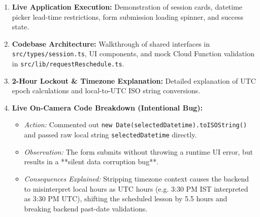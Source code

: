 \documentclass[11pt, a4paper]{article}
\begin{document}
\begin{enumerate}
  \item \textbf{Live Application Execution:} Demonstration of session cards, datetime picker lead-time restrictions, form submission loading spinner, and success state.
  \item \textbf{Codebase Architecture:} Walkthrough of shared interfaces in \texttt{src/types/session.ts}, UI components, and mock Cloud Function validation in \texttt{src/lib/requestReschedule.ts}.
  \item \textbf{2-Hour Lockout \& Timezone Explanation:} Detailed explanation of UTC epoch calculations and local-to-UTC ISO string conversions.
  \item \textbf{Live On-Camera Code Breakdown (Intentional Bug):}
  \begin{itemize}
    \item \textit{Action:} Commented out \texttt{new Date(selectedDatetime).toISOString()} and passed raw local string \texttt{selectedDatetime} directly.
    \item \textit{Observation:} The form submits without throwing a runtime UI error, but results in a **silent data corruption bug**.
    \item \textit{Consequences Explained:} Stripping timezone context causes the backend to misinterpret local hours as UTC hours (e.g. 3:30 PM IST interpreted as 3:30 PM UTC), shifting the scheduled lesson by 5.5 hours and breaking backend past-date validations.
  \end{itemize}
\end{enumerate}
\end{document}
